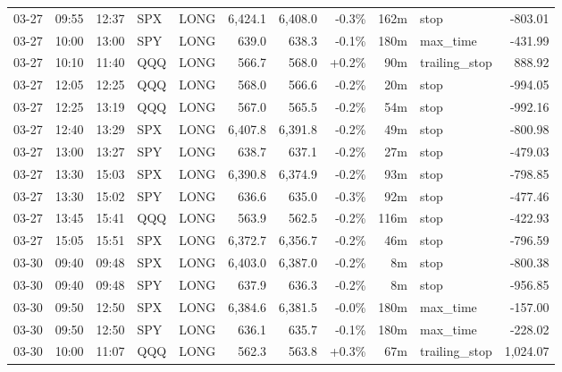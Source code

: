\documentclass[11pt,a4paper,twoside]{article}
\begin{document}
\begin{center}
\begin{longtable}{>{\color{txtmain}}l l l l l r r r r >{\color{txtmain}}l r}
03-27 & 09:55 & 12:37 & SPX & LONG & 6,424.1 & 6,408.0 & \textcolor{lossred}{-0.3\%} & 162m & stop & \textcolor{lossred}{-803.01} \\
03-27 & 10:00 & 13:00 & SPY & LONG & 639.0 & 638.3 & \textcolor{lossred}{-0.1\%} & 180m & max\_time & \textcolor{lossred}{-431.99} \\
03-27 & 10:10 & 11:40 & QQQ & LONG & 566.7 & 568.0 & \textcolor{wingreen}{+0.2\%} & 90m & trailing\_stop & \textcolor{wingreen}{888.92} \\
03-27 & 12:05 & 12:25 & QQQ & LONG & 568.0 & 566.6 & \textcolor{lossred}{-0.2\%} & 20m & stop & \textcolor{lossred}{-994.05} \\
03-27 & 12:25 & 13:19 & QQQ & LONG & 567.0 & 565.5 & \textcolor{lossred}{-0.2\%} & 54m & stop & \textcolor{lossred}{-992.16} \\
03-27 & 12:40 & 13:29 & SPX & LONG & 6,407.8 & 6,391.8 & \textcolor{lossred}{-0.2\%} & 49m & stop & \textcolor{lossred}{-800.98} \\
03-27 & 13:00 & 13:27 & SPY & LONG & 638.7 & 637.1 & \textcolor{lossred}{-0.2\%} & 27m & stop & \textcolor{lossred}{-479.03} \\
03-27 & 13:30 & 15:03 & SPX & LONG & 6,390.8 & 6,374.9 & \textcolor{lossred}{-0.2\%} & 93m & stop & \textcolor{lossred}{-798.85} \\
03-27 & 13:30 & 15:02 & SPY & LONG & 636.6 & 635.0 & \textcolor{lossred}{-0.3\%} & 92m & stop & \textcolor{lossred}{-477.46} \\
03-27 & 13:45 & 15:41 & QQQ & LONG & 563.9 & 562.5 & \textcolor{lossred}{-0.2\%} & 116m & stop & \textcolor{lossred}{-422.93} \\
03-27 & 15:05 & 15:51 & SPX & LONG & 6,372.7 & 6,356.7 & \textcolor{lossred}{-0.2\%} & 46m & stop & \textcolor{lossred}{-796.59} \\
03-30 & 09:40 & 09:48 & SPX & LONG & 6,403.0 & 6,387.0 & \textcolor{lossred}{-0.2\%} & 8m & stop & \textcolor{lossred}{-800.38} \\
03-30 & 09:40 & 09:48 & SPY & LONG & 637.9 & 636.3 & \textcolor{lossred}{-0.2\%} & 8m & stop & \textcolor{lossred}{-956.85} \\
03-30 & 09:50 & 12:50 & SPX & LONG & 6,384.6 & 6,381.5 & \textcolor{lossred}{-0.0\%} & 180m & max\_time & \textcolor{lossred}{-157.00} \\
03-30 & 09:50 & 12:50 & SPY & LONG & 636.1 & 635.7 & \textcolor{lossred}{-0.1\%} & 180m & max\_time & \textcolor{lossred}{-228.02} \\
03-30 & 10:00 & 11:07 & QQQ & LONG & 562.3 & 563.8 & \textcolor{wingreen}{+0.3\%} & 67m & trailing\_stop & \textcolor{wingreen}{1,024.07} \\

\end{longtable}
\end{center}
\end{document}
